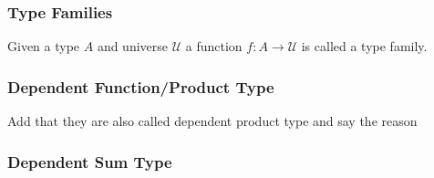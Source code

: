 \documentclass[14pt,compress]{beamer}
\newcommand{\U}{\mathcal{U}}
\begin{document}
\begin{frame}\label{frame : universes and type families}
\frametitle{Type Families}
Given a type $A$ and universe $\U$ a function $f : A \to \U$ is called a
\textcolor{beamer@mathtext}{type family}.

\end{frame}

\begin{frame}\label{frame : dependent function type}
\frametitle{Dependent Function/Product Type}
Add that they are also called dependent product type and say the reason
\end{frame}

\begin{frame}\label{frame : dependent sum type}
\frametitle{Dependent Sum Type}

\end{frame}

\end{document}
